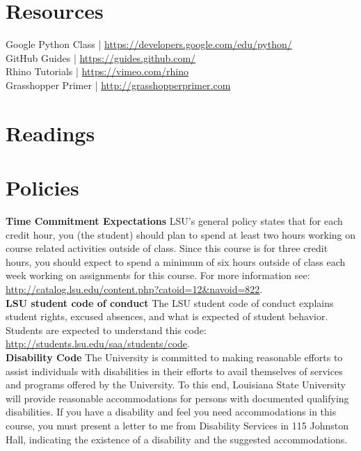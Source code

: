 \documentclass[11pt,article,oneside]{memoir}
\begin{document}
\section{Resources}
Google Python Class | \url{https://developers.google.com/edu/python/}\\
GitHub Guides | \url{https://guides.github.com/}\\
Rhino Tutorials | \url{https://vimeo.com/rhino}\\
Grasshopper Primer | \url{http://grasshopperprimer.com}\\

\clearpage

\section{Readings}
\renewcommand*{\bibfont}{\normalsize} %
\vspace*{0.5cm}
\nocite{*}
\setlength{}
\printbibliography[heading=none]

\clearpage
\section{Policies}

\noindent \textbf{Time Commitment Expectations}
LSU's general policy states that for each credit hour, you (the student) should plan to
spend at least two hours working on course related activities outside of class. Since this course is for three credit hours, you should expect to spend a minimum of six hours outside of class each week working on assignments for this course. For more information see: 
\url{http://catalog.lsu.edu/content.php?catoid=12&navoid=822}.\\

\noindent \textbf{LSU student code of conduct}
The LSU student code of conduct explains student rights, excused absences, and what is expected of student behavior. Students are expected to understand this code:  \url{http://students.lsu.edu/saa/students/code}.\\ %

\noindent \textbf{Disability Code}
The University is committed to making reasonable efforts to assist individuals with disabilities in
their efforts to avail themselves of services and programs offered by the University. To this end,
Louisiana State University will provide reasonable accommodations for persons with
documented qualifying disabilities. If you have a disability and feel you need accommodations in
this course, you must present a letter to me from Disability Services in 115 Johnston Hall,
indicating the existence of a disability and the suggested accommodations.\\
\end{document}
